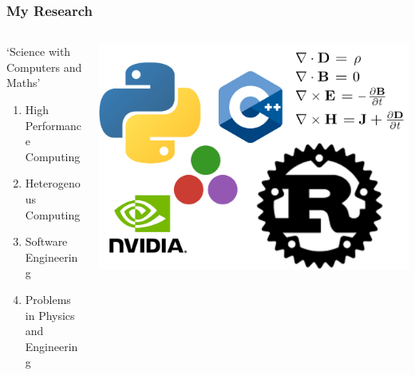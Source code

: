 \begin{frame}
    \frametitle{My Research}
    \begin{columns}
        \begin{column}{0.5\textwidth}
            `Science with Computers and Maths'
           \begin{enumerate}
               \item High Performance Computing
               \item Heterogenous Computing
               \item Software Engineering
               \item Problems in Physics and Engineering
           \end{enumerate}
        \end{column}
        \begin{column}{0.5\textwidth}
            \begin{center}
                \begin{minipage}{0.48\textwidth}
                    \includegraphics[width=1.6\linewidth]{assets/collage.png}
                \end{minipage}
            \end{center}
        \end{column}
    \end{columns}
\end{frame}
